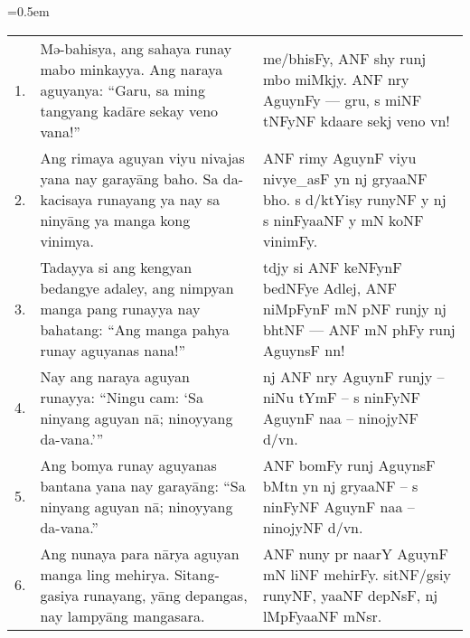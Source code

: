 \documentclass[12pt,paper=a4]{scrartcl}
\begin{document}
\tabulinesep=0.5em
\begin{longtabu} to \linewidth {X[1r] X[12] X[12l]}

1.
	& Mə-bahisya, ang sahaya runay mabo minkayya. Ang naraya aguyanya: \enquote{Garu, sa ming tangyang kadāre sekay veno vana!}
	& {\Tagati me/bhisFy, ANF shy runj mbo miMkjy. ANF nry AguynFy — gru, s miNF tNFyNF kdaare sekj veno vn!}
	\\
	
2.
	& Ang rimaya aguyan viyu nivajas yana nay garayāng baho. Sa da-kacisaya runayang ya nay sa ninyāng ya manga kong vi\-nim\-ya.
	& {\Tagati ANF rimy AguynF viyu nivye\_asF yn nj gryaaNF bho. s d/ktYisy runyNF y nj s ninFyaaNF y mN koNF vinimFy.}
	\\
	
3.
	& Tadayya si ang kengyan bedangye adaley, ang nimpyan manga pang runayya nay bahatang: \enquote{Ang manga pahya runay aguyanas nana!}
	& {\Tagati tdjy si ANF keNFynF bedNFye Adlej, ANF niMpFynF mN pNF runjy nj bhtNF — ANF mN phFy runj AguynsF nn!}
	\\
	
4.
	& Nay ang naraya aguyan runayya: \enquote{Ningu cam: \enquote{Sa ninyang aguyan nā; ninoyyang da-vana.}}
	& {\Tagati nj ANF nry AguynF runjy – niNu tYmF – s ninFyNF AguynF naa – ninojyNF d/vn.}
	\\
	
5.
	& Ang bomya runay aguyanas bantana yana nay garayāng: \enquote{Sa ninyang aguyan nā; ninoyyang da-vana.}
	& {\Tagati ANF bomFy runj AguynsF bMtn yn nj gryaaNF – s ninFyNF AguynF naa – ninojyNF d/vn.}
	\\
	
6.
	& Ang nunaya para nārya aguyan manga ling mehirya. Sitang-gasiya runayang, yāng depangas, nay lampyāng mangasara.
	& {\Tagati ANF nuny pr naarY AguynF mN liNF mehirFy. sitNF/gsiy runyNF, yaaNF depNsF, nj lMpFyaaNF mNsr.}
	\\

\end{longtabu}


\clearpage

\begin{multicols}{3}%
\printglossary[style=mysuper,type=\leipzigtype]
\end{multicols}

\printbibliography[heading=none]
\end{document}
